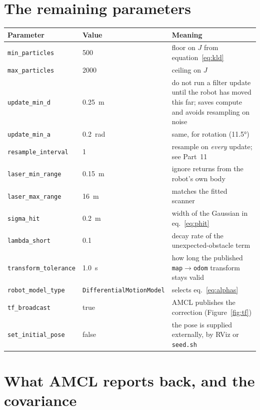 \documentclass[11pt,a4paper]{report}
\newcommand{\file}[1]{\texttt{\small #1}}
\begin{document}
\section{The remaining parameters}

\begin{center}
\small
\begin{tabular}{@{}llp{7.3cm}@{}}
\toprule
\textbf{Parameter} & \textbf{Value} & \textbf{Meaning} \\
\midrule
\file{min\_particles}  & 500  & floor on $J$ from equation~\eqref{eq:kld} \\
\file{max\_particles}  & 2000 & ceiling on $J$ \\
\file{update\_min\_d}  & \SI{0.25}{\metre} & do not run a filter update until the
   robot has moved this far; saves compute and avoids resampling on noise \\
\file{update\_min\_a}  & \SI{0.2}{\radian} & same, for rotation (\ang{11.5}) \\
\file{resample\_interval} & 1 & resample on \emph{every} update; see Part~11 \\
\file{laser\_min\_range} & \SI{0.15}{\metre} & ignore returns from the robot's own body \\
\file{laser\_max\_range} & \SI{16}{\metre} & matches the fitted scanner \\
\file{sigma\_hit}      & \SI{0.2}{\metre} & width of the Gaussian in eq.~\eqref{eq:phit} \\
\file{lambda\_short}   & 0.1 & decay rate of the unexpected-obstacle term \\
\file{transform\_tolerance} & \SI{1.0}{\second} & how long the published
   \texttt{map}$\rightarrow$\texttt{odom} transform stays valid \\
\file{robot\_model\_type} & \file{DifferentialMotionModel} & selects eq.~\eqref{eq:alphas} \\
\file{tf\_broadcast}   & true & AMCL publishes the correction (Figure~\ref{fig:tf}) \\
\file{set\_initial\_pose} & false & the pose is supplied externally, by RViz or \file{seed.sh} \\
\bottomrule
\end{tabular}
\end{center}

\section{What AMCL reports back, and the covariance}
\end{document}
